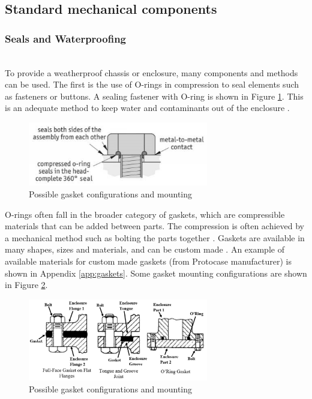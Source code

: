 \subsection{Standard mechanical components}


\subsubsection{Seals and Waterproofing}
 \mbox{}\\

To provide a weatherproof chassis or enclosure, many components and methods can be used. The first is the use of O-rings in compression to seal elements such as fasteners or buttons. A sealing fastener with O-ring is shown in Figure \ref{fig:seal_fastener}. This is an adequate method to keep water and contaminants out of the enclosure \cite{fastenright_sealing_nodate}.

\begin{figure}[H]
    \centering
    \includegraphics[width=0.7\textwidth]{Sections/LiteratureReview/img/seals/seal_fastener.JPG}
    \caption{Possible gasket configurations and mounting \cite{automotion_components_integral_nodate}}
    \label{fig:seal_fastener}
\end{figure}

O-rings often fall in the broader category of gaskets, which are compressible materials that can be added between parts. The compression is often achieved by a mechanical method such as bolting the parts together \cite{ali_m._sadegh_marks_2018}. Gaskets are available in many shapes, sizes and materials, and can be custom made \cite{protocase_custom_nodate}. An example of available materials for custom made gaskets (from Protocase manufacturer) is shown in Appendix \ref{app:gaskets}. Some gasket mounting configurations are shown in Figure \ref{fig:gasket_final}.

\begin{figure}[H]
    \centering
    \includegraphics[width=0.7\textwidth]{Sections/LiteratureReview/img/seals/gasket_final.JPG}
    \caption{Possible gasket configurations and mounting \cite{ali_m._sadegh_marks_2018}}
    \label{fig:gasket_final}
\end{figure}

